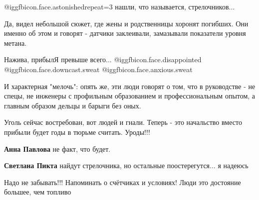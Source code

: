 \begin{itemize}
\begin{itemize}
 @igg{fbicon.face.astonished}{repeat=3}  нашли, что называется, стрелочников...
\end{itemize} %


Да, видел небольшой сюжет, где жены и родственницы хоронят погибших. Они именно
об этом и говорят - датчики заклеивали, замазывали показатели уровня метана.

Нажива, прибылЯ превыше всего... @igg{fbicon.face.disappointed}  @igg{fbicon.face.downcast.sweat}  @igg{fbicon.face.anxious.sweat} 

И характерная "мелочь": опять же, эти люди говорят о том, что в руководстве -
не спецы, не инженеры с профильным образованием и профессиональным опытом, а
главным образом дельцы и барыги без оных.


Уголь сейчас востребован, вот людей и гнали. Теперь - это начальство вместо
прибыли будет годы в тюрьме считать. Уроды!!!

\begin{itemize} %
\textbf{Анна Павлова} не факт, что будет.

\textbf{Светлана Пикта} найдут стрелочника, но остальные поостерегутся... я надеюсь
\end{itemize} %

Надо не забывать!!!
Напоминать о счётчиках и условиях!
Люди это достояние большее, чем топливо

\end{itemize} %
